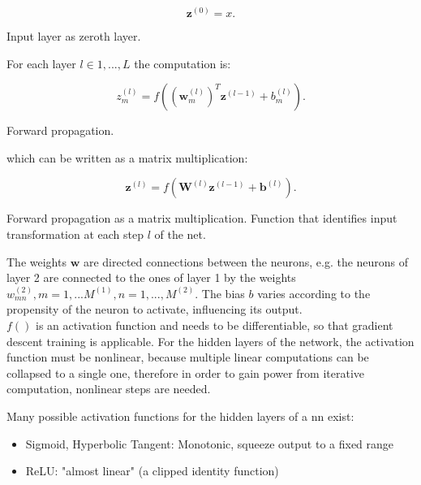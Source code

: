 \begin{Equation}[H]
	\centering
	\begin{equation} \label{eq:neurbas4}
		\bm{z}^{(0)} = x .
	\end{equation}
	\caption[Input layer as zeroth layer.]{Input layer as zeroth layer.}
\end{Equation}

\noindent For each layer $l \in 1,...,L$ the computation is:

\begin{Equation}[H]
	\centering
	\begin{equation} \label{eq:neurbas5}
		z^{(l)}_m = f( (\bm{w}^{(l)}_m)^T \bm{z}^{(l-1)} + b^{(l)}_m) .
	\end{equation}
	\caption[Forward propagation.]{Forward propagation.}
\end{Equation}

\noindent which can be written as a matrix multiplication:

\begin{Equation}[H]
	\centering
	\begin{equation} \label{eq:forwpropag}
		\bm{z}^{(l)} = f( \bm{W}^{(l)} \bm{z}^{(l-1)} + \bm{b}^{(l)}) .
	\end{equation}
	\caption[Forward propagation as a matrix multiplication.]{Forward propagation as a matrix multiplication. Function that identifies input transformation at each step $l$ of the net.}	
\end{Equation}

\noindent The weights $\bm{w}$ are directed connections between the neurons, e.g. the neurons of layer 2 are connected to the ones of layer 1 by the weights $w^{(2)}_{mn}, m=1,...M^{(1)}, n=1,...,M^{(2)}$. The bias $b$ varies according to the propensity of the neuron to activate, influencing its output. \\

\noindent $f()$ is an activation function and needs to be differentiable, so that gradient descent training is applicable. For the hidden layers of the network, the activation function must be nonlinear, because multiple linear computations can be collapsed to a single one, therefore in order to gain power from iterative computation, nonlinear steps are needed.

\noindent Many possible activation functions for the hidden layers of a \gls{nn} exist:
\begin{itemize}
	\item Sigmoid, Hyperbolic Tangent: Monotonic, squeeze output to a fixed range
	\item ReLU: "almost linear" (a clipped identity function)
\end{itemize}

